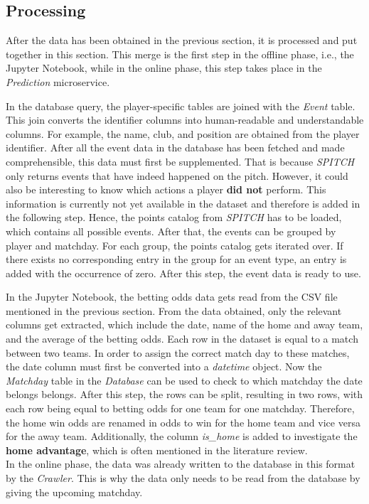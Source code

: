 \subsection{Processing}

After the data has been obtained in the previous section, it is processed and put together in this section. This merge is the first step in the offline phase, i.e., the Jupyter Notebook, while in the online phase, this step takes place in the \emph{Prediction} microservice. 

In the database query, the player-specific tables are joined with the \emph{Event} table. This join converts the identifier columns into human-readable and understandable columns. For example, the name, club, and position are obtained from the player identifier. After all the event data in the database has been fetched and made comprehensible, this data must first be supplemented. That is because \emph{SPITCH} only returns events that have indeed happened on the pitch. However, it could also be interesting to know which actions a player \textbf{did not} perform. This information is currently not yet available in the dataset and therefore is added in the following step. Hence, the points catalog from \emph{SPITCH} \parencite[see][]{spitch_points_2021} has to be loaded, which contains all possible events. After that, the events can be grouped by player and matchday. For each group, the points catalog gets iterated over. If there exists no corresponding entry in the group for an event type, an entry is added with the occurrence of zero. After this step, the event data is ready to use.

In the Jupyter Notebook, the betting odds data gets read from the CSV file mentioned in the previous section. From the data obtained, only the relevant columns get extracted, which include the date, name of the home and away team, and the average of the betting odds. Each row in the dataset is equal to a match between two teams. In order to assign the correct match day to these matches, the date column must first be converted into a \emph{datetime} object. Now the \emph{Matchday} table in the \emph{Database} can be used to check to which matchday the date belongs belongs. After this step, the rows can be split, resulting in two rows, with each row being equal to betting odds for one team for one matchday. Therefore, the home win odds are renamed in odds to win for the home team and vice versa for the away team. Additionally, the column \emph{is\_home} is added to investigate the \textbf{home advantage}, which is often mentioned in the literature review. \\
In the online phase, the data was already written to the database in this format by the \emph{Crawler}. This is why the data only needs to be read from the database by giving the upcoming matchday.

